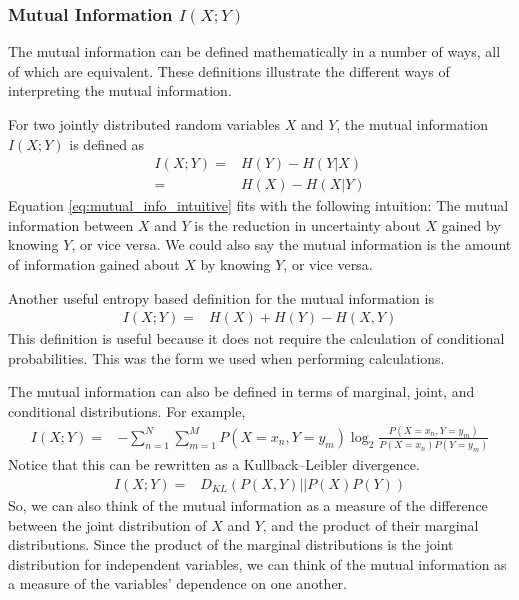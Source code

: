 \documentclass[a4paper,12pt]{article}
\theoremstyle{definition}
\begin{document}
        \subsubsection{Mutual Information $I(X;Y)$}
        The mutual information can be defined mathematically in a number of ways, all of which are equivalent. These definitions illustrate the different ways of interpreting the mutual information.

        For two jointly distributed random variables $X$ and $Y$, the mutual information $I(X;Y)$ is defined as
        \begin{align}\label{eq:mutual_info_intuitive}
        I(X;Y)  =& H(Y) - H(Y|X) \\
                =& H(X) - H(X|Y)
        \end{align}
        Equation \ref{eq:mutual_info_intuitive} fits with the following intuition: The mutual information between $X$ and $Y$ is the reduction in uncertainty about $X$ gained by knowing $Y$, or vice versa. We could also say the mutual information is the amount of information gained about $X$ by knowing $Y$, or vice versa.

        Another useful entropy based definition for the mutual information is
        \begin{align}\label{eq:mutual_info_useful}
        I(X;Y)  =& H(X) + H(Y) - H(X,Y)
        \end{align}
        This definition is useful because it does not require the calculation of conditional probabilities. This was the form we used when performing calculations.

        The mutual information can also be defined in terms of marginal, joint, and conditional distributions. For example,
        \begin{align}\label{eq:mutual_info_log}
        I(X;Y)  =& -\sum_{n=1}^N \sum_{m=1}^M P(X=x_n, Y=y_m) \log _2 \frac{P(X=x_n, Y=y_m)}{P(X=x_n) P(Y=y_m)}
        \end{align}
        Notice that this can be rewritten as a Kullback–Leibler divergence.
        \begin{align}
        I(X;Y)  =& D_{KL}(P(X,Y)|| P(X)P(Y))
        \end{align}
        So, we can also think of the mutual information as a measure of the difference between the joint distribution of $X$ and $Y$, and the product of their marginal distributions. Since the product of the marginal distributions is the joint distribution for independent variables, we can think of the mutual information as a measure of the variables' dependence on one another.
\end{document}
